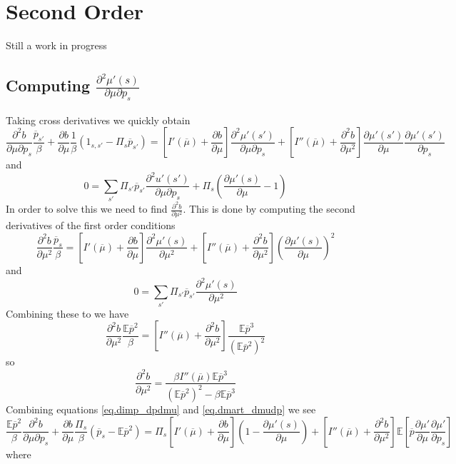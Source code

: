 \documentclass[12pt]{article}
\newcommand{\EE}{\mathbb E}
\newcommand{\pbar}{{\overline p}}
\newcommand{\mubar}{{\overline \mu}}
\begin{document}
\section{Second Order}
Still a work in progress
\subsection{Computing $\frac{\partial^2 \mu'(s)}{\partial\mu\partial p_s}$}
Taking cross derivatives we quickly obtain
\begin{equation}\label{eq.dimp_dpdmu}
	\frac{\partial^2 b}{\partial\mu\partial p_s}\frac{\pbar_{s'}}{\beta}+\frac{\partial b}{\partial \mu}\frac1\beta\left(1_{s,s'} - \Pi_s \pbar_{s'}\right) = \left[I'(\mubar)+\frac{\partial b}{\partial \mu}\right]\frac{\partial^2 \mu'(s')}{\partial\mu\partial p_s} + \left[I''(\mubar) +\frac{\partial^2 b}{\partial\mu^2}\right]\frac{\partial\mu'(s')}{\partial \mu}\frac{\partial \mu'(s')}{\partial p_s}
\end{equation}and 
\begin{equation}\label{eq.dmart_dmudp}
	0 = \sum_{s'}\Pi_{s'}\pbar_{s'}\frac{\partial^2u'(s')}{\partial \mu\partial p_s} + \Pi_s\left(\frac{\partial\mu'(s)}{\partial\mu}-1\right)
\end{equation}  In order to solve this we need to find  $\frac{\partial ^2 b}{\partial \mu^2}$.  This is done by computing the second derivatives of the first order conditions
\[
	\frac{\partial^2 b}{\partial\mu^2} \frac{\pbar_s}{\beta} =\left[ I'(\mubar) +\frac{\partial b}{\partial\mu}\right]\frac{\partial^2\mu'(s)}{\partial\mu^2} + \left[I''(\mubar)+\frac{\partial^2b}{\partial\mu^2}\right]\left(\frac{\partial \mu'(s)}{\partial\mu}\right)^2
\]and
\[
 0 = \sum_{s'}\Pi_{s'}\pbar_{s'}\frac{\partial^2\mu'(s)}{\partial\mu^2}
\]Combining these to we have
\[
	\frac{\partial^2 b}{\partial \mu^2} \frac{\EE\pbar^2}{\beta} = \left[I''(\mubar)+\frac{\partial^2b}{\partial \mu^2}\right]\frac{\EE\pbar^3}{(\EE\pbar^2)^2}
\]so
\[
	\frac{\partial^2b}{\partial\mu^2} = \frac{\beta I''(\mubar)\EE\pbar^3}{(\EE\pbar^2)^2-\beta\EE\pbar^3}
\]Combining equations \eqref{eq.dimp_dpdmu} and \eqref{eq.dmart_dmudp} we see
\[
	\frac{\EE \pbar^2}{\beta}\frac{\partial^2 b}{\partial\mu\partial p_s} + \frac{\partial b}{\partial \mu}\frac{\Pi_s}\beta(\pbar_s-\EE\pbar^2) = \Pi_s\left[I'(\mubar)+\frac{\partial b}{\partial \mu}\right]\left(1-\frac{\partial \mu'(s)}{\partial \mu}\right)+\left[I''(\mubar)+\frac{\partial^2b}{\partial\mu^2}\right]\EE\left[\pbar\frac{\partial \mu'}{\partial\mu}\frac{\partial\mu'}{\partial p_s}\right]
\]where
\end{document}
